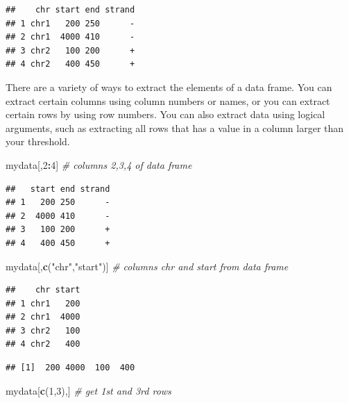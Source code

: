 \documentclass[12pt,]{krantz}
\newenvironment{Shaded}{\begin{snugshade}}{\end{snugshade}}
\newcommand{\CommentTok}[1]{\textcolor[rgb]{0.56,0.35,0.01}{\textit{#1}}}
\newcommand{\DecValTok}[1]{\textcolor[rgb]{0.00,0.00,0.81}{#1}}
\newcommand{\KeywordTok}[1]{\textcolor[rgb]{0.13,0.29,0.53}{\textbf{#1}}}
\newcommand{\NormalTok}[1]{#1}
\newcommand{\OperatorTok}[1]{\textcolor[rgb]{0.81,0.36,0.00}{\textbf{#1}}}
\newcommand{\StringTok}[1]{\textcolor[rgb]{0.31,0.60,0.02}{#1}}
\begin{document}
\begin{verbatim}
##    chr start end strand
## 1 chr1   200 250      -
## 2 chr1  4000 410      -
## 3 chr2   100 200      +
## 4 chr2   400 450      +
\end{verbatim}

There are a variety of ways to extract the elements of a data frame. You can extract certain columns using column numbers or names, or you can extract certain rows by using row numbers. You can also extract data using logical arguments, such as extracting all rows that has a value in a column larger than your threshold.

\begin{Shaded}
\begin{Highlighting}[]
\NormalTok{mydata[,}\DecValTok{2}\OperatorTok{:}\DecValTok{4}\NormalTok{] }\CommentTok{# columns 2,3,4 of data frame}
\end{Highlighting}
\end{Shaded}

\begin{verbatim}
##   start end strand
## 1   200 250      -
## 2  4000 410      -
## 3   100 200      +
## 4   400 450      +
\end{verbatim}

\begin{Shaded}
\begin{Highlighting}[]
\NormalTok{mydata[,}\KeywordTok{c}\NormalTok{(}\StringTok{"chr"}\NormalTok{,}\StringTok{"start"}\NormalTok{)] }\CommentTok{# columns chr and start from data frame}
\end{Highlighting}
\end{Shaded}

\begin{verbatim}
##    chr start
## 1 chr1   200
## 2 chr1  4000
## 3 chr2   100
## 4 chr2   400
\end{verbatim}

\begin{Shaded}
\end{Shaded}

\begin{verbatim}
## [1]  200 4000  100  400
\end{verbatim}

\begin{Shaded}
\begin{Highlighting}[]
\NormalTok{mydata[}\KeywordTok{c}\NormalTok{(}\DecValTok{1}\NormalTok{,}\DecValTok{3}\NormalTok{),] }\CommentTok{# get 1st and 3rd rows}
\end{Highlighting}
\end{Shaded}
\end{document}
